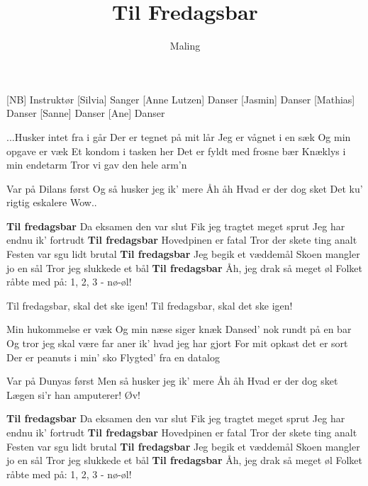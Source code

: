 \documentclass[a4paper,11pt]{article}
\title{Til Fredagsbar}
\author{Maling}
\begin{document}
  \maketitle

  \begin{roles}
[NB] Instruktør
    [Silvia] Sanger
[Anne Lutzen] Danser
[Jasmin] Danser
[Mathias] Danser
[Sanne] Danser
[Ane] Danser
  \end{roles}

  \begin{song}
  
  
  
...Husker intet fra i går
Der er tegnet på mit lår
Jeg er vågnet i en sæk
Og min opgave er væk
Et kondom i tasken her
Det er fyldt med frosne bær
Knæklys i min endetarm
Tror vi gav den hele arm'n 

Var på Dilans først
Og så husker jeg ik' mere
Åh åh
Hvad er der dog sket
Det ku' rigtig eskalere
Wow..

\textbf{Til fredagsbar}
Da eksamen den var slut
Fik jeg tragtet meget sprut
Jeg har endnu ik' fortrudt
\textbf{Til fredagsbar}
Hovedpinen er fatal
Tror der skete ting analt
Festen var sgu lidt brutal
\textbf{Til fredagsbar}
Jeg begik et væddemål
Skoen mangler jo en sål
Tror jeg slukkede et bål
\textbf{Til fredagsbar}
Åh, jeg drak så meget øl
Folket råbte med på: 1, 2, 3 - nø-øl!

Til fredagsbar, skal det ske igen!
Til fredagsbar, skal det ske igen!

Min hukommelse er væk
Og min næse siger knæk
Dansed' nok rundt på en bar
Og tror jeg skal være far
aner ik' hvad jeg har gjort
For mit opkast det er sort
Der er peanuts i min' sko
Flygted' fra en datalog

Var på Dunyas først
Men så husker jeg ik' mere
Åh åh
Hvad er der dog sket
Lægen si'r han amputerer!
Øv!

\textbf{Til fredagsbar}
Da eksamen den var slut
Fik jeg tragtet meget sprut
Jeg har endnu ik' fortrudt
\textbf{Til fredagsbar}
Hovedpinen er fatal
Tror der skete ting analt
Festen var sgu lidt brutal
\textbf{Til fredagsbar}
Jeg begik et væddemål
Skoen mangler jo en sål
Tror jeg slukkede et bål
\textbf{Til fredagsbar}
Åh, jeg drak så meget øl
Folket råbte med på: 1, 2, 3 - nø-øl!


\end{song}
\end{document}
